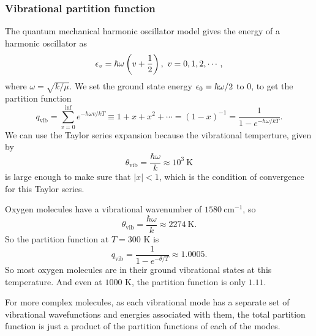 \subsubsection{Vibrational partition function}
The quantum mechanical harmonic oscillator model gives the energy of a harmonic 
oscillator as 
\begin{equation}
\ep_v=\hbar\omega\lf(v+\frac{1}{2} \rt),\ v=0,1,2,\cdots,
\end{equation}
where $\omega=\sqrt{k/\mu}$. We set the ground state energy 
$\epsilon_0=\hbar\omega/2$ to $0$, to get the partition function
\begin{equation}
q_{\text{vib}}=\sum^{\inf}_{v=0}e^{-\hbar\omega v/kT}\equiv1+x+x^2+\cdots=(1-x)^{-1}=\frac{1}{1-e^{-\hbar\omega/kT}}.
\end{equation}
We can use the Taylor series expansion because the vibrational temperture, given by
\begin{equation}
\theta_{\text{vib}}=\frac{\hbar\omega}{k}\approx10^3\ \text{K}
\end{equation}
is large enough to make sure that $|x|<1$, which is the condition of convergence for this Taylor series. 
\begin{wex}
Oxygen molecules have a vibrational wavenumber of $1580\ \text{cm}^{-1}$, so
\begin{equation}
\theta_{\text{vib}}=\frac{\hbar\omega}{k}\approx2274\ \text{K}.
\end{equation}
So the partition function at $T=300$ K is 
\begin{equation}
q_{\text{vib}}=\frac{1}{1-e^{-\theta/T}}\approx1.0005.
\end{equation}
So most oxygen molecules are in their ground vibrational states at this temperature. And even at $1000$ K, the partition function is only $1.11$. 
\end{wex}
For more complex molecules, as each vibrational mode has a separate set of vibrational wavefunctions and energies associated with them, the total partition function is just a product of the partition functions of each of the modes.
